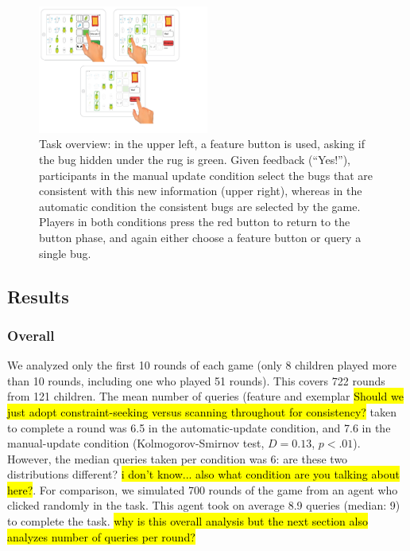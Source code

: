 \documentclass[10pt,letterpaper]{article}
\begin{document}
\begin{figure}[!h]
  \centering
  \includegraphics[width=0.5\textwidth]{figures/task_overview}
  \caption{Task overview: in the upper left, a feature button is used, asking if the bug 
hidden under the rug is green. Given feedback (``Yes!''), participants in the manual 
update condition select the bugs that are consistent with this new information (upper 
right), whereas in the automatic condition the consistent bugs are selected by the 
game. Players in both conditions press the red button to return to the button phase, 
and again either choose a feature button or query a single bug.}
  \label{fig:task-overview}
\end{figure} 


\subsection{Results}

\subsubsection{Overall}

We analyzed only the first 10 rounds of each game (only 8 children played more than 
10 rounds, including one who played 51 rounds). This covers 722 rounds from 121 
children. The mean number of queries (feature 
and exemplar \hl{Should we just adopt constraint-seeking versus scanning throughout for consistency?} taken to complete a round was 6.5 in the automatic-update condition, 
and 7.6 in the manual-update condition (Kolmogorov-Smirnov test, $D = 
0.13$, $p<.01$). However, the median queries taken per 
condition was 6: are these two distributions different? \hl{i don't know... also what
condition are you talking about here?}.  For comparison, 
we simulated 700 rounds of the game from an agent who clicked
randomly in the task.  This agent took on average 8.9 queries (median: 9) to complete the
task.  \hl{why is this overall analysis but the next section also analyzes
number of queries per round?}
\end{document}
